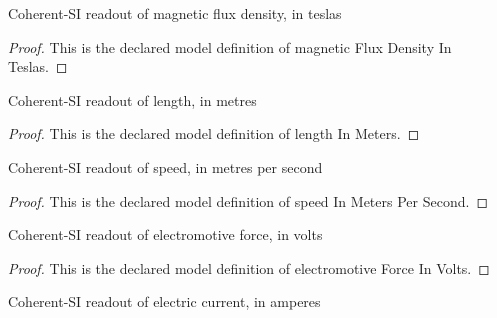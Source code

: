 \begin{definition}
  \label{def:physics:phyx-mini-0919:phyxminiproblems-problemphyxmini0919-magneticfluxdensityinteslas}
  Coherent-SI readout of magnetic flux density, in teslas
\end{definition}
\begin{proof}
  This is the declared model definition of magnetic Flux Density In Teslas.
\end{proof}
\begin{definition}
  \label{def:physics:phyx-mini-0919:phyxminiproblems-problemphyxmini0919-lengthinmeters}
  Coherent-SI readout of length, in metres
\end{definition}
\begin{proof}
  This is the declared model definition of length In Meters.
\end{proof}
\begin{definition}
  \label{def:physics:phyx-mini-0919:phyxminiproblems-problemphyxmini0919-speedinmeterspersecond}
  Coherent-SI readout of speed, in metres per second
\end{definition}
\begin{proof}
  This is the declared model definition of speed In Meters Per Second.
\end{proof}
\begin{definition}
  \label{def:physics:phyx-mini-0919:phyxminiproblems-problemphyxmini0919-electromotiveforceinvolts}
  Coherent-SI readout of electromotive force, in volts
\end{definition}
\begin{proof}
  This is the declared model definition of electromotive Force In Volts.
\end{proof}
\begin{definition}
  \label{def:physics:phyx-mini-0919:phyxminiproblems-problemphyxmini0919-electriccurrentinamperes}
  Coherent-SI readout of electric current, in amperes
\end{definition}
